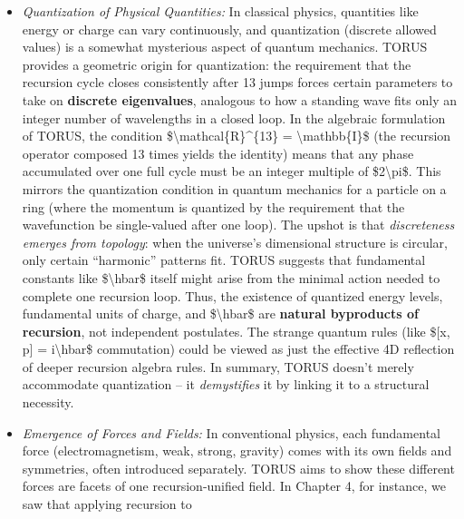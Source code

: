 \documentclass[
]{article}
\begin{document}
\begin{itemize}
\item
  \emph{Quantization of Physical Quantities:} In classical physics,
  quantities like energy or charge can vary continuously, and
  quantization (discrete allowed values) is a somewhat mysterious aspect
  of quantum mechanics. TORUS provides a geometric origin for
  quantization: the requirement that the recursion cycle closes
  consistently after 13 jumps forces certain parameters to take on
  \textbf{discrete eigenvalues}, analogous to how a standing wave fits
  only an integer number of wavelengths in a closed loop\hspace{0pt}. In
  the algebraic formulation of TORUS, the condition
  \$\textbackslash mathcal\{R\}\^{}\{13\} = \textbackslash mathbb\{I\}\$
  (the recursion operator composed 13 times yields the identity) means
  that any phase accumulated over one full cycle must be an integer
  multiple of \$2\textbackslash pi\$\hspace{0pt}. This mirrors the
  quantization condition in quantum mechanics for a particle on a ring
  (where the momentum is quantized by the requirement that the
  wavefunction be single-valued after one loop)\hspace{0pt}. The upshot
  is that \emph{discreteness emerges from topology}: when the universe's
  dimensional structure is circular, only certain ``harmonic'' patterns
  fit. TORUS suggests that fundamental constants like
  \$\textbackslash hbar\$ itself might arise from the minimal action
  needed to complete one recursion loop\hspace{0pt}. Thus, the existence
  of quantized energy levels, fundamental units of charge, and
  \$\textbackslash hbar\$ are \textbf{natural byproducts of recursion},
  not independent postulates\hspace{0pt}. The strange quantum rules
  (like \${[}x, p{]} = i\textbackslash hbar\$ commutation) could be
  viewed as just the effective 4D reflection of deeper recursion algebra
  rules\hspace{0pt}. In summary, TORUS doesn't merely accommodate
  quantization -- it \emph{demystifies} it by linking it to a structural
  necessity.
\item
  \emph{Emergence of Forces and Fields:} In conventional physics, each
  fundamental force (electromagnetism, weak, strong, gravity) comes with
  its own fields and symmetries, often introduced separately. TORUS aims
  to show these different forces are facets of one recursion-unified
  field. In Chapter 4, for instance, we saw that applying recursion to

\end{itemize}
\end{document}
